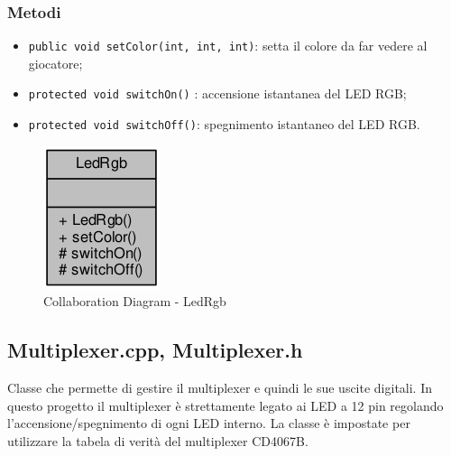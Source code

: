 \subsubsection{Metodi}
\begin{itemize}
	\item \texttt{public void setColor(int, int, int)}: setta il colore da far vedere al giocatore;
	\item \texttt{protected	void switchOn()} : accensione istantanea del LED RGB;
	\item \texttt{protected	void switchOff()}: spegnimento istantaneo del LED RGB.
\end{itemize}
\begin{figure}[!ht]
	\centering
	\includegraphics[scale=.5]{img/UML/CollaborationDiagram/LedRgb.png}
	\caption{Collaboration Diagram - LedRgb}
\end{figure}

\newpage
\subsection{Multiplexer.cpp, Multiplexer.h}
Classe che permette di gestire il multiplexer e quindi le sue uscite digitali. In questo progetto il multiplexer è strettamente legato ai LED a 12 pin regolando l'accensione/spegnimento di ogni LED interno. La classe è impostate per utilizzare la tabela di verità del multiplexer CD4067B.
